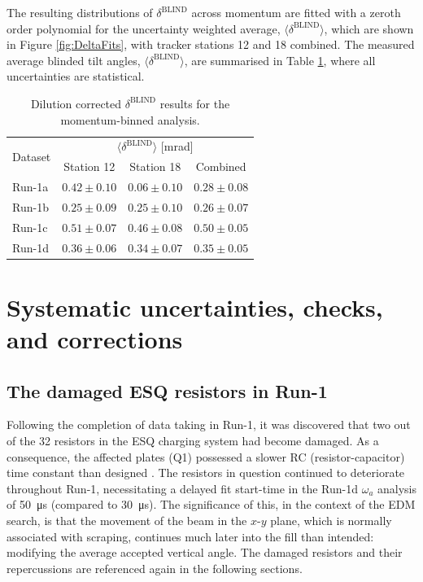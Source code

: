 The resulting distributions of $\delta^{\text{BLIND}}$ across momentum are fitted with a zeroth order polynomial for the uncertainty weighted average, $\langle \delta^{\text{BLIND}} \rangle$, which are shown in Figure \ref{fig:DeltaFits}, with tracker stations 12 and 18 combined. The measured average blinded tilt angles, $\langle\delta^{\text{BLIND}}\rangle$, are summarised in Table \ref{tbl:Run1MomBinnedTiltAngles}, where all uncertainties are statistical.%

\begin{table}[t!]
\centering{}
\begin{tabular}{l|ccc}
\hline
\hline
\multirow{2}{*}{Dataset} & \multicolumn{3}{c}{$\langle\delta^{\text{BLIND}}\rangle$ [mrad]} \\ \cline{2-4}
& Station 12 & Station 18 & Combined \\ %
\hline
Run-1a &  $0.42\pm0.10$ & $0.06\pm0.10$ & $0.28\pm0.08$\\
Run-1b &  $0.25\pm0.09$ & $0.25\pm0.10$ & $0.26\pm0.07$\\
Run-1c &  $0.51\pm0.07$ & $0.46\pm0.08$ & $0.50\pm0.05$\\ 
Run-1d &  $0.36\pm0.06$ & $0.34\pm0.07$ & $0.35\pm0.05$\\ 
\hline
\hline
\end{tabular}
\caption{Dilution corrected $\delta^{\text{BLIND}}$ results for the momentum-binned analysis.} 
\label{tbl:Run1MomBinnedTiltAngles}
\end{table}


\section{Systematic uncertainties, checks, and corrections}\label{sec:Run1Syst}


\subsection{The damaged ESQ resistors in Run-1}

Following the completion of data taking in Run-1, it was discovered that two out of the 32 resistors in the ESQ charging system had become damaged. As a consequence, the affected plates (Q1) possessed a slower RC (resistor-capacitor) time constant than designed \cite{OmegaARun1}\cite{BeamDynamics}. The resistors in question continued to deteriorate throughout Run-1, necessitating a delayed fit start-time in the Run-1d $\omega_{a}$ analysis of \SI{50}{\micro\second} (compared to \SI{30}{\micro\second}). The significance of this, in the context of the EDM search, is that the movement of the beam in the $x$-$y$ plane, which is normally associated with scraping, continues much later into the fill than intended: modifying the average accepted vertical angle. The damaged resistors and their repercussions are referenced again in the following sections. %

